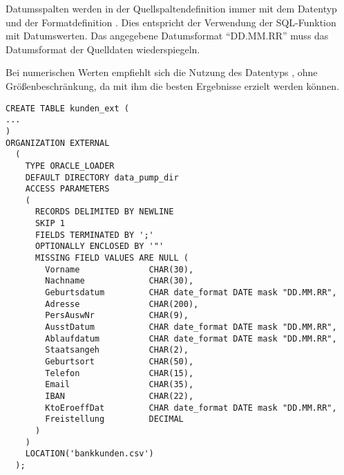           Datumsspalten werden in der Quellspaltendefinition immer mit dem Datentyp  und der Formatdefinition . Dies entspricht der Verwendung der SQL-Funktion  mit Datumswerten. Das angegebene Datumsformat \enquote{DD.MM.RR} muss das Datumsformat der Quelldaten wiederspiegeln.

          Bei numerischen Werten empfiehlt sich die Nutzung des Datentyps , ohne Gr\"o\ss{}enbeschr\"ankung, da mit ihm die besten Ergebnisse erzielt werden k\"onnen.
          \begin{lstlisting}[caption={Festlegen der Access parameter},label=admin928a,language=oracle_sql]
CREATE TABLE kunden_ext (
...
)
ORGANIZATION EXTERNAL
  (
    TYPE ORACLE_LOADER
    DEFAULT DIRECTORY data_pump_dir
    ACCESS PARAMETERS
    (
      RECORDS DELIMITED BY NEWLINE
      SKIP 1
      FIELDS TERMINATED BY ';'
      OPTIONALLY ENCLOSED BY '"'
      MISSING FIELD VALUES ARE NULL (
        Vorname              CHAR(30),
        Nachname             CHAR(30),
        Geburtsdatum         CHAR date_format DATE mask "DD.MM.RR",
        Adresse              CHAR(200),
        PersAuswNr           CHAR(9),
        AusstDatum           CHAR date_format DATE mask "DD.MM.RR",
        Ablaufdatum          CHAR date_format DATE mask "DD.MM.RR",
        Staatsangeh          CHAR(2),
        Geburtsort           CHAR(50),
        Telefon              CHAR(15),
        Email                CHAR(35),
        IBAN                 CHAR(22),
        KtoEroeffDat         CHAR date_format DATE mask "DD.MM.RR",
        Freistellung         DECIMAL
      )
    )
    LOCATION('bankkunden.csv')
  );
          \end{lstlisting}
